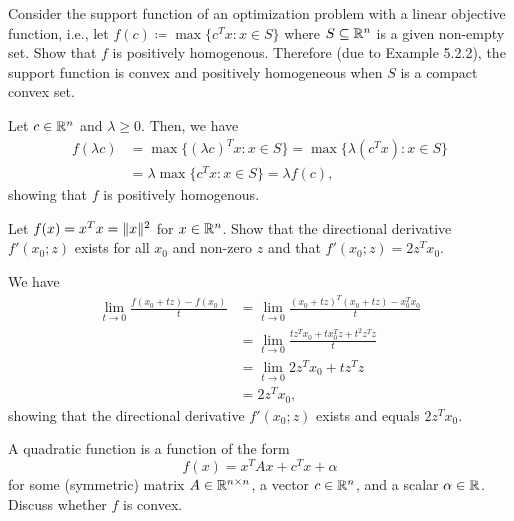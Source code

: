 \begin{exercise}
  Consider the support function of an optimization problem with a linear objective function, i.e., let $f(c) \coloneq \max\{ c^T x : x \in S \}$ where $S \subseteq \mathbb{R}^n$ is a given non-empty set.
  Show that $f$ is positively homogenous.
  Therefore (due to Example 5.2.2), the support function is convex and positively homogeneous when $S$ is a compact convex set.
\end{exercise}

\begin{solution}
  Let $c \in \mathbb{R}^n$ and $\lambda \geq 0$.
  Then, we have
  \begin{align*}
    f(\lambda c)
    &= \max\{ (\lambda c)^T x : x \in S \}
    = \max\{ \lambda (c^T x) : x \in S \} \\
    &= \lambda \max\{ c^T x : x \in S \}
    = \lambda f(c),
  \end{align*}
  showing that $f$ is positively homogenous.
\end{solution}

\begin{exercise}
  Let $f(x) = x^T x = \lVert x\rVert^2$ for $x \in \mathbb{R}^n$.
  Show that the directional derivative $f'(x_0; z)$ exists for all $x_0$ and non-zero $z$ and that $f'(x_0; z) = 2 z^T x_0$.
\end{exercise}

\begin{solution}
  We have
  \begin{align*}
    \lim_{t \to 0} \frac{f(x_0 + t z) - f(x_0)}{t}
    &= \lim_{t \to 0} \frac{(x_0 + t z)^T (x_0 + t z) - x_0^T x_0}{t} \\
    &= \lim_{t \to 0} \frac{t z^T x_0 + t x_0^T z + t^2 z^T z}{t} \\
    &= \lim_{t \to 0} 2 z^T x_0 + t z^T z \\
    &= 2 z^T x_0,
  \end{align*}
  showing that the directional derivative $f'(x_0; z)$ exists and equals $2 z^T x_0$.
\end{solution}

\begin{exercise}\label{ex:5.15}
  A quadratic function is a function of the form
  \begin{equation}
    f(x) = x^T A x + c^T x + \alpha
  \end{equation}
  for some (symmetric) matrix $A \in \mathbb{R}^{n \times n}$, a vector $c \in \mathbb{R}^n$, and a scalar $\alpha \in \mathbb{R}$.
  Discuss whether $f$ is convex.
\end{exercise}

